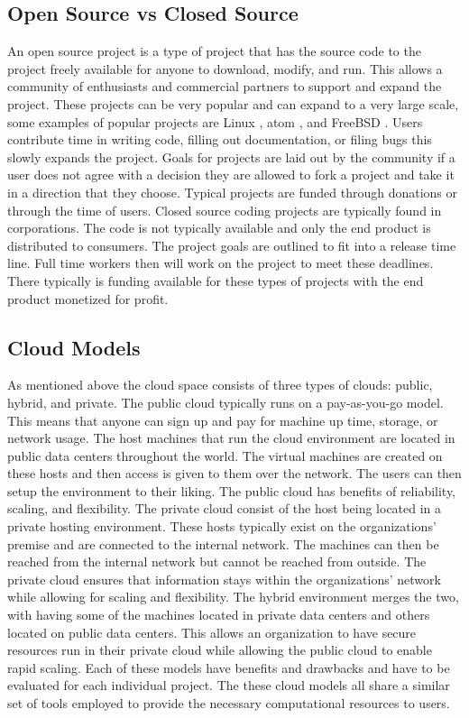 \documentclass[12pt]{article}
\begin{document}
\subsection{Open Source vs Closed Source}
An open source project is a type of project that has the source code to the project freely available for anyone to download, modify, and run. This allows a community of enthusiasts and commercial partners to support and expand the project. These projects can be very popular and can expand to a very large scale, some examples of popular projects are Linux \cite{Linux}, atom \cite{atom}, and FreeBSD \cite{freebsd}. Users contribute time in writing code, filling out documentation, or filing bugs this slowly expands the project. Goals for projects are laid out by the community if a user does not agree with a decision they are allowed to fork a project and take it in a direction that they choose.  Typical projects are funded through donations or through the time of users.  Closed source coding projects are typically found in corporations. The code is not typically available and only the end product is distributed to consumers. The project goals are outlined to fit into a release time line. Full time workers then will work on the project to meet these deadlines. There typically is funding available for these types of projects with the end product monetized for profit.

\subsection{Cloud Models}
As mentioned above the cloud space consists of three types of clouds: public, hybrid, and private. The public cloud typically runs on a pay-as-you-go model. This means that anyone can sign up and pay for machine up time, storage, or network usage. The host machines that run the cloud environment are located in public data centers throughout the world. The virtual machines are created on these hosts and then access is given to them over the network. The users can then setup the environment to their liking. The public cloud has benefits of reliability, scaling, and flexibility. The private cloud consist of the host being located in a private hosting environment.  These hosts typically exist on the organizations' premise and are connected to the internal network. The machines can then be reached from the internal network but cannot be reached from outside. The private cloud ensures that information stays within the organizations' network while allowing for scaling and flexibility. The hybrid environment merges the two, with having some of the machines located in private data centers and others located on public data centers. This allows an organization to have secure resources run in their private cloud while allowing the public cloud to enable rapid scaling.  Each of these models have benefits and drawbacks and have to be evaluated for each individual project. The these cloud models all share a similar set of tools employed to provide the necessary computational resources to users.
\end{document}
